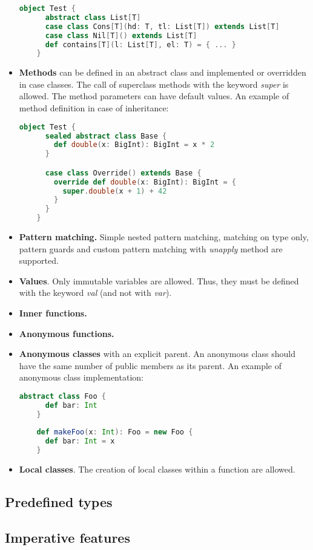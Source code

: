 \begin{itemize}
  \begin{lstlisting}[language=Scala]
    object Test {
      abstract class List[T]
      case class Cons[T](hd: T, tl: List[T]) extends List[T]
      case class Nil[T]() extends List[T]
      def contains[T](l: List[T], el: T) = { ... }
    }
  \end{lstlisting}
  \item \textbf{Methods} can be defined in an abstract class and implemented or overridden in case classes. 
  The call of superclass methods with the keyword \textit{super} is allowed. 
  The method parameters can have default values. 
  An example of method definition in case of inheritance:
  \begin{lstlisting}[language=Scala]
    object Test {
      sealed abstract class Base {
        def double(x: BigInt): BigInt = x * 2
      }

      case class Override() extends Base {
        override def double(x: BigInt): BigInt = {
          super.double(x + 1) + 42
        }
      }
    }
  \end{lstlisting}
  \item \textbf{Pattern matching.} 
  Simple nested pattern matching, matching on type only, pattern guards and custom pattern matching with \textit{unapply} method are supported.
  \item \textbf{Values}. 
  Only immutable variables are allowed. Thus, they must be defined with the keyword \textit{val} (and not with \textit{var}).
  \item \textbf{Inner functions.}
  \item \textbf{Anonymous functions.}
  \item \textbf{Anonymous classes} with an explicit parent. 
  An anonymous class should have the same number of public members as its parent.
  An example of anonymous class implementation:
  \begin{lstlisting}[language=Scala]
    abstract class Foo {
      def bar: Int
    }
    
    def makeFoo(x: Int): Foo = new Foo {
      def bar: Int = x
    }
  \end{lstlisting}
  \item \textbf{Local classes}. The creation of local classes within a function are allowed.
\end{itemize}
\subsection{Predefined types}
\subsection{Imperative features}